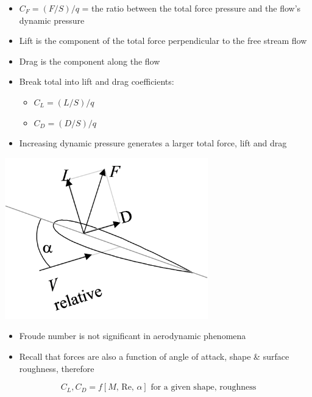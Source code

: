 \documentclass[
]{book}
\providecommand{\tightlist}{%
  \setlength{\itemsep}{0pt}\setlength{\parskip}{0pt}}
\begin{document}
\begin{itemize}
\tightlist
\item
  \(C_F = (F/S)/q\) = the ratio between the total force pressure and the flow's dynamic pressure
\item
  Lift is the component of the total force perpendicular to the free stream flow
\item
  Drag is the component along the flow
\item
  Break total into lift and drag coefficients:

  \begin{itemize}
  \tightlist
  \item
    \(C_L = (L/S)/q\)
  \item
    \(C_D = (D/S)/q\)
  \end{itemize}
\item
  Increasing dynamic pressure generates a larger total force, lift and drag
\end{itemize}

\includegraphics[width=\textwidth,height=2.75in]{media/05/image5.svg}

\begin{itemize}
\tightlist
\item
  Froude number is not significant in aerodynamic phenomena
\item
  Recall that forces are also a function of angle of attack, shape \& surface roughness, therefore
\end{itemize}

\[C_L,C_D = f \left[ M \text{, } \mathrm{Re} \text{, } \alpha \right] \text{ for a given shape, roughness} \]
\end{document}
